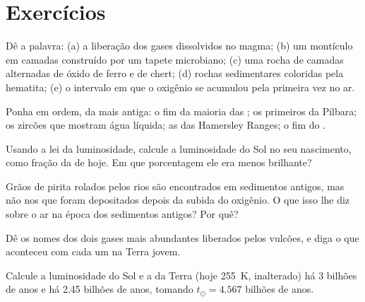 \section{Exercícios}

\begin{exercise}[$\star$]\label{exo:g12:early-earth:1}
Dê a palavra: (a) a liberação dos gases dissolvidos no magma; (b) um
montículo em camadas construído por um tapete microbiano; (c) uma rocha de
camadas alternadas de óxido de ferro e de chert; (d) rochas sedimentares
coloridas pela hematita; (e) o intervalo em que o oxigênio se acumulou pela
primeira vez no ar.
\end{exercise}

\begin{exercise}[$\star$]\label{exo:g12:early-earth:2}
Ponha em ordem, da mais antiga: o fim da maioria das ; os primeiros  da Pilbara; os zircões que mostram água
líquida; as  das Hamersley Ranges; o fim do
.
\end{exercise}

\begin{exercise}[$\star$]\label{exo:g12:early-earth:3}
Usando a lei da luminosidade, calcule a luminosidade do Sol no seu
nascimento, como fração da de hoje. Em que porcentagem ele era menos
brilhante?
\end{exercise}

\begin{exercise}[$\star$]\label{exo:g12:early-earth:4}
Grãos de pirita rolados pelos rios são encontrados em sedimentos antigos, mas
não nos que foram depositados depois da subida do oxigênio. O que isso lhe
diz sobre o ar na época dos sedimentos antigos? Por quê?
\end{exercise}

\begin{exercise}[$\star$]\label{exo:g12:early-earth:5}
Dê os nomes dos dois gases mais abundantes liberados pelos vulcões, e diga o
que aconteceu com cada um na Terra jovem.
\end{exercise}

\begin{exercise}[$\star\star$]\label{exo:g12:early-earth:6}
Calcule a luminosidade do Sol e a  da Terra (hoje
\qty{255}{K},  inalterado) há 3 bilhões de anos e há 2.45 bilhões de
anos, tomando $t_\odot = 4.567$ bilhões de anos.
\end{exercise}

